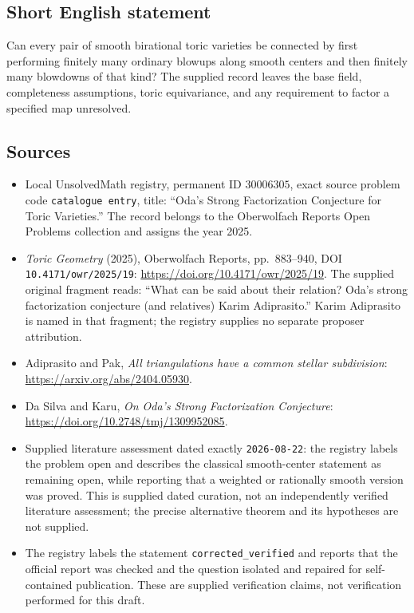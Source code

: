 \documentclass[11pt]{article}
\begin{document}
\subsection{Short English statement}
Can every pair of smooth birational toric varieties be connected by first performing finitely many ordinary blowups along smooth centers and then finitely many blowdowns of that kind? The supplied record leaves the base field, completeness assumptions, toric equivariance, and any requirement to factor a specified map unresolved.
\subsection{Sources}
\begin{itemize}
\item Local UnsolvedMath registry, permanent ID \(30006305\), exact source problem code \texttt{catalogue entry}, title: ``Oda's Strong Factorization Conjecture for Toric Varieties.'' The record belongs to the Oberwolfach Reports Open Problems collection and assigns the year 2025.
\item \emph{Toric Geometry} (2025), Oberwolfach Reports, pp.\ 883--940, DOI \texttt{10.4171/owr/2025/19}: \url{https://doi.org/10.4171/owr/2025/19}. The supplied original fragment reads: ``What can be said about their relation? Oda's strong factorization conjecture (and relatives) Karim Adiprasito.'' Karim Adiprasito is named in that fragment; the registry supplies no separate proposer attribution.
\item Adiprasito and Pak, \emph{All triangulations have a common stellar subdivision}: \url{https://arxiv.org/abs/2404.05930}.
\item Da Silva and Karu, \emph{On Oda's Strong Factorization Conjecture}: \url{https://doi.org/10.2748/tmj/1309952085}.
\item Supplied literature assessment dated exactly \texttt{2026-08-22}: the registry labels the problem open and describes the classical smooth-center statement as remaining open, while reporting that a weighted or rationally smooth version was proved. This is supplied dated curation, not an independently verified literature assessment; the precise alternative theorem and its hypotheses are not supplied.
\item The registry labels the statement \texttt{corrected\_verified} and reports that the official report was checked and the question isolated and repaired for self-contained publication. These are supplied verification claims, not verification performed for this draft.
\end{itemize}
\end{document}
